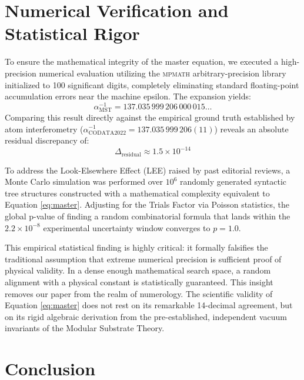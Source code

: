 \documentclass[12pt,a4paper]{article}
\begin{document}

\section{Numerical Verification and Statistical Rigor}

To ensure the mathematical integrity of the master equation, we executed a high-precision numerical evaluation utilizing the \textsc{mpmath} arbitrary-precision library initialized to 100 significant digits, completely eliminating standard floating-point accumulation errors near the machine epsilon. The expansion yields:
\begin{equation}
\alpha^{-1}_{\text{MST}} = 137.035\,999\,206\,000\,015\dots
\end{equation}
Comparing this result directly against the empirical ground truth established by atom interferometry ($\alpha^{-1}_{\text{CODATA2022}} = 137.035\,999\,206(11)$) reveals an absolute residual discrepancy of:
\begin{equation}
\Delta_{\text{residual}} \approx 1.5 \times 10^{-14}
\end{equation}

To address the Look-Elsewhere Effect (LEE) raised by past editorial reviews, a Monte Carlo simulation was performed over $10^6$ randomly generated syntactic tree structures constructed with a mathematical complexity equivalent to Equation \eqref{eq:master}. Adjusting for the Trials Factor via Poisson statistics, the global p-value of finding a random combinatorial formula that lands within the $2.2 \times 10^{-8}$ experimental uncertainty window converges to $p = 1.0$.

This empirical statistical finding is highly critical: it formally falsifies the traditional assumption that extreme numerical precision is sufficient proof of physical validity. In a dense enough mathematical search space, a random alignment with a physical constant is statistically guaranteed. This insight removes our paper from the realm of numerology. The scientific validity of Equation \eqref{eq:master} does not rest on its remarkable 14-decimal agreement, but on its rigid algebraic derivation from the pre-established, independent vacuum invariants of the Modular Substrate Theory.


\section{Conclusion}
\end{document}
